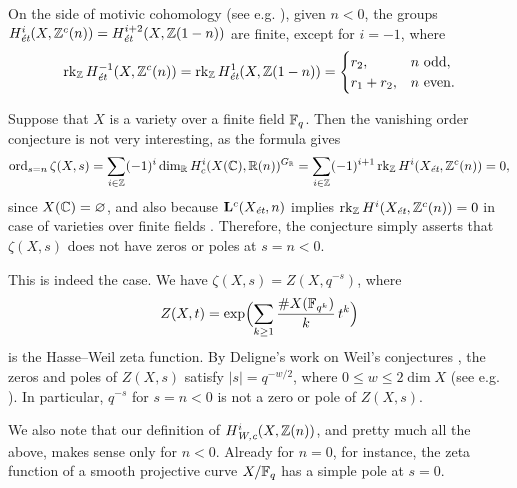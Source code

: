 \documentclass{article}
\numberwithin{equation}{section}
\begin{document}
\begin{example}
  On the side of motivic cohomology
  (see e.g. \cite[Proposition~4.14]{Geisser-2017}), given $n < 0$, the groups
  $H^i_\et (X, \ZZ^c (n)) = H^{i+2}_\et (X, \ZZ (1-n))$ are finite, except for
  $i = -1$, where
  \[ \rk_\ZZ H^{-1}_\et (X, \ZZ^c (n)) =
    \rk_\ZZ H^1_\et (X, \ZZ (1-n)) = \begin{cases}
      r_2, & n \text{ odd},\\
      r_1 + r_2, & n \text{ even}.
    \end{cases} \]
\end{example}

\begin{example}
  Suppose that $X$ is a variety over a finite field $\FF_q$. Then the vanishing
  order conjecture is not very interesting, as the formula gives
  \[ \ord_{s=n} \zeta (X,s) =
    \sum_{i \in \ZZ} (-1)^i \dim_\RR H^i_c (X(\CC), \RR (n))^{G_\RR} =
    \sum_{i \in \ZZ} (-1)^{i+1} \rk_\ZZ H^i (X_\et, \ZZ^c (n)) = 0, \]
  since $X (\CC) = \emptyset$, and also because $\mathbf{L}^c (X_\et, n)$
  implies $\rk_\ZZ H^i (X_\et, \ZZ^c (n)) = 0$ in case of varieties over finite
  fields \cite[Proposition~4.2]{Beshenov-Weil-etale-1}. Therefore, the
  conjecture simply asserts that $\zeta (X,s)$ does not have zeros or poles at
  $s = n < 0$.

  This is indeed the case. We have $\zeta (X,s) = Z (X,q^{-s})$, where
  $$Z (X,t) = \exp \Bigl(\sum_{k\ge 1} \frac{\# X (\FF_{q^k})}{k}\,t^k\Bigr)$$
  is the Hasse--Weil zeta function. By Deligne's work on Weil's conjectures
  \cite{Deligne-Weil-II}, the zeros and poles of $Z (X,s)$ satisfy
  $|s| = q^{-w/2}$, where $0 \le w \le 2 \dim X$ (see
  e.g. \cite[pp.\,26--27]{Katz-1994}). In particular, $q^{-s}$ for $s = n < 0$
  is not a zero or pole of $Z (X,s)$.

  We also note that our definition of $H^i_\Wc (X, \ZZ(n))$, and pretty much all
  the above, makes sense only for $n < 0$. Already for $n = 0$, for instance,
  the zeta function of a smooth projective curve $X/\FF_q$ has a simple pole
  at $s = 0$.
\end{example}
\end{document}
